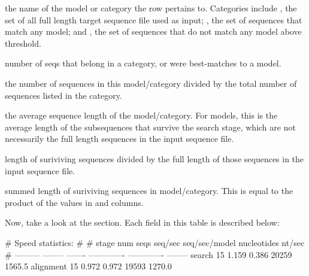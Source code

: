 \begin{wideitem}
\item[\emprog{model or category}] the name of the model or category
  the row pertains to. Categories include , the set of 
  all full length target sequence file used as input; ,
  the set of sequences that match any model; and , the set of
  sequences that do not match any model above threshold. 

\item[\emprog{number of seqs}] number of seqs that belong in a
  category, or were best-matches to a model.

\item[\emprog{fraction of total}] the number of sequences in this
  model/category divided by the total number of sequences listed in the
   category.

\item[\emprog{average length}] the average sequence length of the
  model/category. For models, this is the average length of the
  subsequences that survive the search stage, which are not
  necessarily the full length sequences in the input sequence file.

\item[\emprog{average coverage}] length of suriviving sequences
  divided by the full length of those sequences in the input sequence
  file. 

\item[\emprog{nucleotides}] summed length of suriviving sequences in
  model/category. This is equal to the product of the values in
   and  columns.
\end{wideitem}

Now, take a look at the  section. Each field in
this table is described below:

\begin{sreoutput}
# Speed statistics:
#
# stage      num seqs  seq/sec  seq/sec/model    nucleotides    nt/sec
# ---------  --------  -------  -------------  -------------  --------
  search           15    1.159          0.386          20259    1565.5
  alignment        15    0.972          0.972          19593    1270.0
\end{sreoutput}

